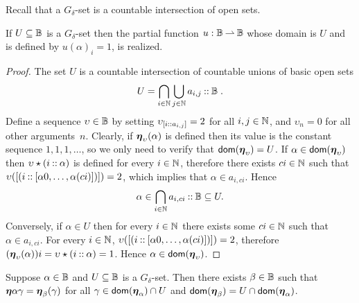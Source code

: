 %
%
Recall that a $G_\delta$-set is a countable intersection of open sets.

\begin{proposition}
  \label{th:G_delta_characteristic}%
  If $U \subseteq \mathbb{B}$ is a $G_\delta$-set then the partial
  function $u: \mathbb{B} \mathbin{\rightharpoonup} \mathbb{B}$ whose domain is $U$ and is
  defined by $u(\alpha)_i = 1$, is realized.
\end{proposition}

\begin{proof}
  The set $U$ is a countable intersection of countable unions of basic
  open sets
  \begin{equation*}
    U = \bigcap_{i \in \mathbb{N}}
        \bigcup_{j \in \mathbb{N}} a_{i,j} \mathbin{{:}{:}} \mathbb{B} \;.
  \end{equation*}
  Define a sequence $\upsilon \in \mathbb{B}$ by setting
  $\upsilon_{[i \mathbin{{:}{:}} a_{i,j}]} = 2$ for all $i, j \in \mathbb{N}$, and
  $\upsilon_n = 0$ for all other arguments~$n$. Clearly, if
  $\text{\boldmath{$\eta$}}_{\upsilon}(\alpha)$ is defined then its value is the constant
  sequence $1, 1, 1, \ldots$, so we only need to verify that
  $\mathsf{dom}(\text{\boldmath{$\eta$}}_\upsilon) = U$. If $\alpha \in \mathsf{dom}(\text{\boldmath{$\eta$}}_\upsilon)$
  then $\upsilon \star (i \mathbin{{:}{:}} \alpha)$ is defined for every $i \in
  \mathbb{N}$, therefore there exists $c i \in \mathbb{N}$ such that $\upsilon
  ([(i \mathbin{{:}{:}} [\alpha 0, \ldots, \alpha (c i)])]) = 2$, which
  implies that $\alpha \in {a_{i, c i}}$. Hence
  \begin{equation*}
    \alpha \in \bigcap_{i \in \mathbb{N}} a_{i, c i} \mathbin{{:}{:}} \mathbb{B} \subseteq U.
  \end{equation*}
  Conversely, if $\alpha \in U$ then for every $i \in \mathbb{N}$ there
  exists some $c i \in \mathbb{N}$ such that $\alpha \in a_{i, c i}$. For
  every $i \in \mathbb{N}$, $\upsilon ([(i \mathbin{{:}{:}} [\alpha 0, \ldots,
      \alpha (c i)])]) = 2$, therefore $(\text{\boldmath{$\eta$}}_{\upsilon}(\alpha)) i =
  \upsilon \star (i \mathbin{{:}{:}} \alpha) = 1$.  Hence $\alpha \in
  \mathsf{dom}(\text{\boldmath{$\eta$}}_\upsilon)$.
\end{proof}


\begin{corollary}
  \label{th:restrict_G_delta}%
  Suppose $\alpha \in \mathbb{B}$ and $U \subseteq \mathbb{B}$ is a $G_\delta$-set.
  Then there exists $\beta \in \mathbb{B}$ such that $\text{\boldmath{$\eta$}}{\alpha}{\gamma} =
  \text{\boldmath{$\eta$}}_{\beta}(\gamma)$ for all $\gamma \in \mathsf{dom}(\text{\boldmath{$\eta$}}_\alpha) \cap U$ and
  $\mathsf{dom}(\text{\boldmath{$\eta$}}_\beta) = U \cap \mathsf{dom}(\text{\boldmath{$\eta$}}_\alpha)$.
\end{corollary}

